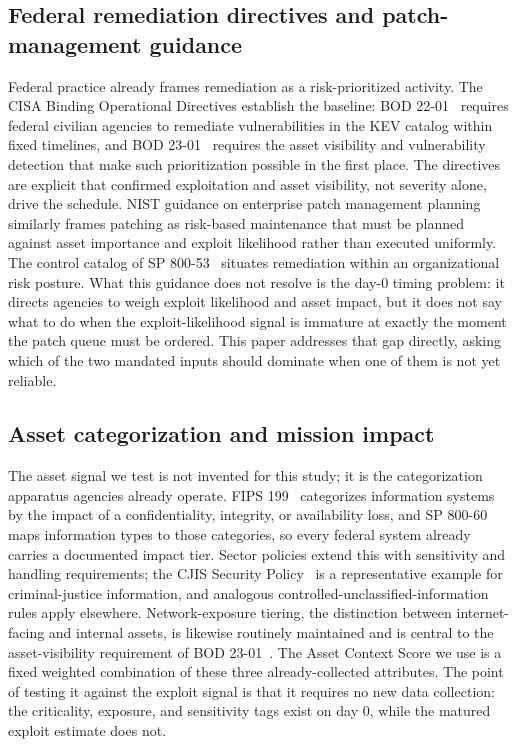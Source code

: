 \documentclass[journal]{IEEEtran}
\begin{document}
\subsection{Federal remediation directives and patch-management guidance}
Federal practice already frames remediation as a risk-prioritized activity. The CISA Binding
Operational Directives establish the baseline: BOD 22-01~\cite{cisabod2201} requires federal
civilian agencies to remediate vulnerabilities in the KEV catalog within fixed timelines, and BOD
23-01~\cite{cisabod2301} requires the asset visibility and vulnerability detection that make such
prioritization possible in the first place. The directives are explicit that confirmed exploitation
and asset visibility, not severity alone, drive the schedule. NIST guidance on enterprise patch
management planning~\cite{nist2022sp80040r4} similarly frames patching as risk-based maintenance
that must be planned against asset importance and exploit likelihood rather than executed
uniformly. The control catalog of SP 800-53~\cite{nist80053} situates remediation within an
organizational risk posture. What this guidance does not resolve is the day-0 timing problem: it
directs agencies to weigh exploit likelihood and asset impact, but it does not say what to do when
the exploit-likelihood signal is immature at exactly the moment the patch queue must be ordered.
This paper addresses that gap directly, asking which of the two mandated inputs should dominate
when one of them is not yet reliable.

\subsection{Asset categorization and mission impact}
The asset signal we test is not invented for this study; it is the categorization apparatus
agencies already operate. FIPS 199~\cite{fips199} categorizes information systems by the impact of
a confidentiality, integrity, or availability loss, and SP 800-60~\cite{nist80060} maps information
types to those categories, so every federal system already carries a documented impact tier.
Sector policies extend this with sensitivity and handling requirements; the CJIS Security
Policy~\cite{cjis2023} is a representative example for criminal-justice information, and analogous
controlled-unclassified-information rules apply elsewhere. Network-exposure tiering, the distinction
between internet-facing and internal assets, is likewise routinely maintained and is central to the
asset-visibility requirement of BOD 23-01~\cite{cisabod2301}. The Asset Context Score we use is a
fixed weighted combination of these three already-collected attributes. The point of testing it
against the exploit signal is that it requires no new data collection: the criticality, exposure,
and sensitivity tags exist on day 0, while the matured exploit estimate does not.
\end{document}
